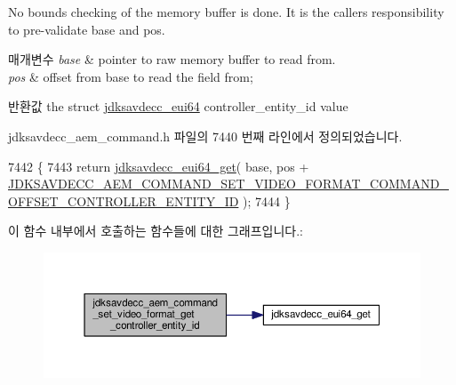 No bounds checking of the memory buffer is done. It is the caller\textquotesingle{}s responsibility to pre-\/validate base and pos.


\begin{DoxyParams}{매개변수}
{\em base} & pointer to raw memory buffer to read from. \\
\hline
{\em pos} & offset from base to read the field from; \\
\hline
\end{DoxyParams}
\begin{DoxyReturn}{반환값}
the struct \hyperlink{structjdksavdecc__eui64}{jdksavdecc\+\_\+eui64} controller\+\_\+entity\+\_\+id value 
\end{DoxyReturn}


jdksavdecc\+\_\+aem\+\_\+command.\+h 파일의 7440 번째 라인에서 정의되었습니다.


\begin{DoxyCode}
7442 \{
7443     \textcolor{keywordflow}{return} \hyperlink{group__eui64_ga2652311a25a6b91cddbed75c108c7031}{jdksavdecc\_eui64\_get}( base, pos + 
      \hyperlink{group__command__set__video__format_ga9ed1154017de9ec5a08773ee08accb49}{JDKSAVDECC\_AEM\_COMMAND\_SET\_VIDEO\_FORMAT\_COMMAND\_OFFSET\_CONTROLLER\_ENTITY\_ID}
       );
7444 \}
\end{DoxyCode}


이 함수 내부에서 호출하는 함수들에 대한 그래프입니다.\+:
\nopagebreak
\begin{figure}[H]
\begin{center}
\leavevmode
\includegraphics[width=350pt]{group__command__set__video__format_ga0346fdee8580fbdf1c40ef625c92f158_cgraph}
\end{center}
\end{figure}


